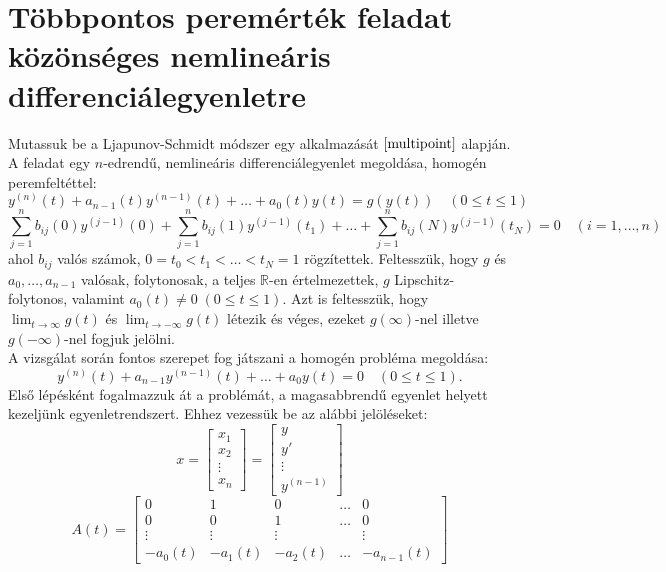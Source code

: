 \documentclass[oneside, titlepage, 12pt, a4paper]{report}
\begin{document}
\section{Többpontos peremérték feladat közönséges nemlineáris differenciálegyenletre}
\label{sec:multipoint}

Mutassuk be a Ljapunov-Schmidt módszer egy alkalmazását $\cite{multipoint}$ alapján. A feladat egy $n$-edrendű, nemlineáris differenciálegyenlet megoldása, homogén peremfeltéttel:
\begin{equation}
y^{(n)}(t) + a_{n-1}(t) y^{(n-1)}(t) + \dots + a_0(t) y(t) = g(y(t)) \quad (0 \leq t \leq 1) \label{eq:mp:inhomOG}
\end{equation}
\begin{equation}
\sum_{j = 1}^n b_{ij}(0) y^{(j-1)}(0) + \sum_{j = 1}^n b_{ij}(1) y^{(j-1)}(t_1) + \dots + \sum_{j = 1}^n b_{ij}(N) y^{(j-1)}(t_N) = 0 \quad (i = 1, \dots, n) \label{eq:mp:boundaryOG}
\end{equation}
ahol $b_{ij}$ valós számok, $0 = t_0 < t_1 < \dots < t_N = 1$ rögzítettek. Feltesszük, hogy $g$ és $a_0, \dots, a_{n-1}$ valósak, folytonosak, a teljes $\mathbb{R}$-en értelmezettek, $g$ Lipschitz-folytonos, valamint $a_0(t) \neq 0 \; (0 \leq t \leq 1)$. Azt is feltesszük, hogy $\lim_{t \to \infty} g(t)$ és $\lim_{t \to -\infty} g(t)$ létezik és véges, ezeket $g(\infty)$-nel illetve $g(-\infty)$-nel fogjuk jelölni. \\
A vizsgálat során fontos szerepet fog játszani a homogén probléma megoldása:
\begin{equation}
y^{(n)}(t) + a_{n-1} y^{(n-1)}(t) + \dots + a_0 y(t) = 0 \quad (0 \leq t \leq 1) \label{eq:mp:homOG}.
\end{equation}
Első lépésként fogalmazzuk át a problémát, a magasabbrendű egyenlet helyett kezeljünk egyenletrendszert. Ehhez vezessük be az alábbi jelöléseket:
\begin{equation*}
x =
	\begin{bmatrix}
		x_1 \\ x_2 \\ \vdots \\ x_n
	\end{bmatrix}
	=
	\begin{bmatrix}
		y \\ y' \\ \vdots \\ y^{(n-1)}
	\end{bmatrix}
\end{equation*}
\begin{equation*}
A(t) =
	\begin{bmatrix}
		0 & 1 & 0 & \dots & 0 \\
		0 & 0 & 1 & \dots & 0 \\
		\vdots & \vdots & \vdots && \vdots \\
		-a_0(t) & -a_1(t) & -a_2(t) & \dots & -a_{n-1}(t)
	\end{bmatrix}
\end{equation*}
\end{document}
